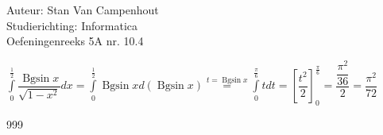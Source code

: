 \documentclass[a4paper]{article}
\begin{document}
  
\noindent \large Auteur: Stan Van Campenhout \\
\noindent \large Studierichting:  Informatica\\
\noindent \large Oefeningenreeks 5A nr. 10.4\\

\medskip

\normalsize

$ \displaystyle\int\limits_0^{\tfrac{1}{2}}\dfrac{\operatorname{Bgsin}x}{\sqrt{1-x^2}}dx
= \displaystyle\int\limits_0^{\tfrac{1}{2}}\operatorname{Bgsin}xd\left(\operatorname{Bgsin}x\right)
\stackrel{t = \operatorname{Bgsin}x}{=} \displaystyle\int\limits_0^{\tfrac{\pi}{6}}tdt = \left[\dfrac{t^2}{2}\right]_0^{\tfrac{\pi}{6}} = \dfrac{\dfrac{\pi^2}{36}}{2} = \dfrac{\pi^2}{72} $\\

\begin{thebibliography}{999}
\end{thebibliography}
\end{document}
